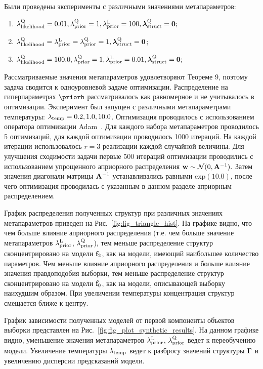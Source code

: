 Были проведены эксперименты с различными значениями метапараметров:
\begin{enumerate}
\item $\lambda_\text{likelihood}^\text{Q} = 0.01, \lambda_\text{prior}^\text{Q} = 1, \lambda_\text{prior}^\text{L} = 100, \boldsymbol{\lambda}_\text{struct}^\text{Q} = \mathbf{0};$
\item $\lambda_\text{likelihood}^\text{Q} = \lambda_\text{prior}^\text{L} = \lambda_\text{prior}^\text{Q} = 1, \boldsymbol{\lambda}_\text{struct}^\text{Q} = \mathbf{0}$;
\item $\lambda_\text{likelihood}^\text{Q} = 100.0, \lambda_\text{prior}^\text{Q} = 1, \lambda_\text{prior}^\text{L} = 0.01, \boldsymbol{\lambda}_\text{struct}^\text{Q} = \mathbf{0};$
\end{enumerate}
Рассматриваемые значения метапараметров удовлетворяют Теореме 9, поэтому задача сводится к одноуровневой задаче оптимизации.
Распределение на гиперпараметрах $\priorh$ рассматривалось как равномерное и не учитывалось в оптимизации. Эксперимент был запущен с различными метапараметрами температуры: $\lambda_{\text{temp}} = 0.2, 1.0, 10.0$. Оптимизация проводилось с использованием оператора оптимизации Adam~\cite{adam}. Для каждого набора метапараметров проводилось 5 оптимизаций, для каждой оптимизации проводилось 1000 итераций. На каждой итерации использовалось $r=3$ реализации каждой случайной величины.  Для улучшения сходимости задачи первые 500 итераций оптимизации проводились с использованием упрощенного априорного распределения $\mathbf{w} \sim \mathcal{N}(0, \mathbf{A}^{-1}).$  Затем значения диагонали матрицы $\mathbf{A}^{-1}$ устанавливались равными $\text{exp}(10.0)$, после чего оптимизация проводилась с указанным в данном разделе априорным распределением. 

График распределения полученных структур при различных значениях метапараметров приведен на Рис.~\ref{fig:fig_triangle_hist}. На графике видно, что чем больше влияние априорного распределения (т.е. чем больше значение метапараметров $\lambda_\text{prior}^\text{L}$, $\lambda_\text{prior}^\text{Q}$), тем меньше распределение структур сконцентрировано на модели $\mathbf{f}_2$, как на модели, имеющий наибольшее количество параметров. Чем меньше влияние априорного распределения и больше влияние значения правдоподобия выборки, тем меньше распределение структур сконцентрировано на модели $\mathbf{f}_0$, как на модели, описывающей выборку наихудшим образом. При увеличении температуры концентрация структур смещается ближе к центру.

График зависимости полученных моделей от первой компоненты объектов выборки представлен на Рис.~\ref{fig:fig_plot_synthetic_results}. На данном графике видно, уменьшение значения метапараметров $\lambda_\text{prior}^\text{L}$, $\lambda_\text{prior}^\text{Q}$ ведет к переобучению модели. Увеличение температуры $\lambda_{\text{temp}}$ ведет к разбросу значений структуры $\boldsymbol{\Gamma}$ и увеличению дисперсии предсказаний модели.



